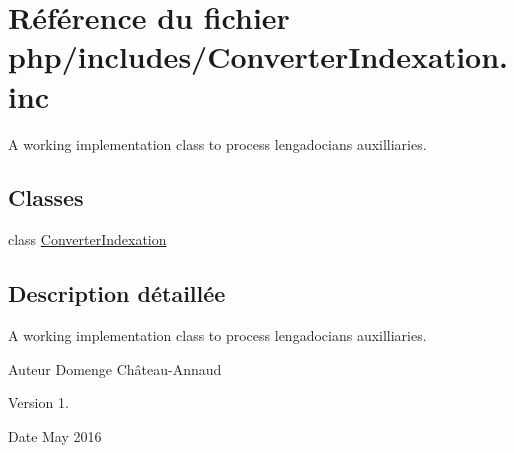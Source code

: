 \hypertarget{ConverterIndexation_8inc}{}\section{Référence du fichier php/includes/\+Converter\+Indexation.inc}
\label{ConverterIndexation_8inc}


A working implementation class to process lengadocians auxilliaries.  


\subsection*{Classes}
\begin{DoxyCompactItemize}
\item 
class \hyperlink{classConverterIndexation}{Converter\+Indexation}
\end{DoxyCompactItemize}


\subsection{Description détaillée}
A working implementation class to process lengadocians auxilliaries. 

\begin{DoxyAuthor}{Auteur}
Domenge Château-\/\+Annaud 
\end{DoxyAuthor}
\begin{DoxyVersion}{Version}
1. 
\end{DoxyVersion}
\begin{DoxyDate}{Date}
May 2016 
\end{DoxyDate}

